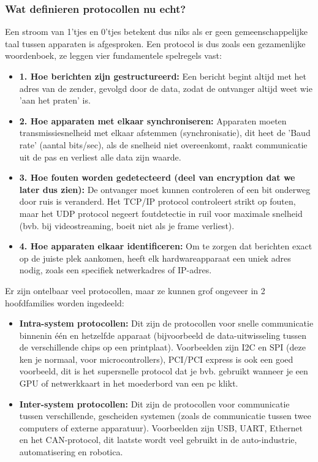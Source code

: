 \documentclass[a4paper,11pt,twoside]{report}
\begin{document}
\subsubsection{Wat definieren protocollen nu echt?}
Een stroom van 1'tjes en 0'tjes betekent dus niks als er geen gemeenschappelijke taal tussen
apparaten is afgesproken. Een protocol is dus zoals een gezamenlijke woordenboek, ze leggen vier
fundamentele spelregels vast:
\begin{itemize}
    \item \textbf{1. Hoe berichten zijn gestructureerd: } Een bericht begint altijd met het adres
    van de zender, gevolgd door de data, zodat de ontvanger altijd weet wie 'aan het praten' is.
    \item \textbf{2. Hoe apparaten met elkaar synchroniseren: } Apparaten moeten transmissiesnelheid
    met elkaar afstemmen (synchronisatie), dit heet de 'Baud rate' (aantal bits/sec), als de
    snelheid niet overeenkomt, raakt communicatie uit de pas en verliest alle data zijn waarde.
    \item \textbf{3. Hoe fouten worden gedetecteerd (deel van encryption dat we later dus zien): }
    De ontvanger moet kunnen controleren of een bit onderweg door ruis is veranderd. Het TCP/IP
    protocol controleert strikt op fouten, maar het UDP protocol negeert foutdetectie in ruil voor
    maximale snelheid (bvb. bij videostreaming, boeit niet als je frame verliest).
    \item \textbf{4. Hoe apparaten elkaar identificeren: } Om te zorgen dat berichten exact op de
    juiste plek aankomen, heeft elk hardwareapparaat een uniek adres nodig, zoals een specifiek
    netwerkadres of IP-adres.
\end{itemize}
Er zijn ontelbaar veel protocollen, maar ze kunnen grof ongeveer in 2 hoofdfamilies worden
ingedeeld:
\begin{itemize}
    \item \textbf{Intra-system protocollen:} Dit zijn de protocollen voor snelle communicatie
    binnenin één en hetzelfde apparaat (bijvoorbeeld de data-uitwisseling tussen de verschillende
    chips op een printplaat). Voorbeelden zijn I2C en SPI (deze ken je normaal, voor
    microcontrollers), PCI/PCI express is ook een goed voorbeeld, dit is het supersnelle protocol
    dat je bvb. gebruikt wanneer je een GPU of netwerkkaart in het moederbord van een pc klikt.
    \item \textbf{Inter-system protocollen:} Dit zijn de protocollen voor communicatie tussen
    verschillende, gescheiden systemen (zoals de communicatie tussen twee computers of externe
    apparatuur). Voorbeelden zijn USB, UART, Ethernet en het CAN-protocol, dit laatste wordt veel
    gebruikt in de auto-industrie, automatisering en robotica.
\end{itemize}
\end{document}
